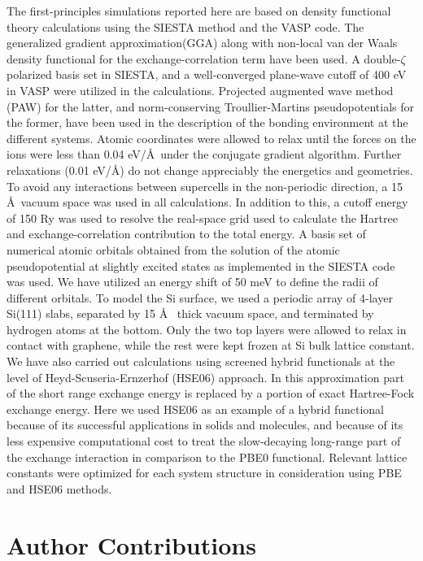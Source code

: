 The first-principles simulations reported here are
based on density functional theory calculations using the {\ttfamily
SIESTA} method\cite{Soler_02_siesta} and the {\ttfamily VASP}
code\cite{Kresse_93_open_shell,Kresse_1996_1}.
%
The generalized gradient approximation(GGA)\cite{Perdew_1996_GGA}
along with non-local van der Waals density functional for the
exchange-correlation term\cite{Dion_2004_vdw} have been used.
%
A double-$\zeta$ polarized basis set in {\ttfamily SIESTA}, and a
well-converged plane-wave cutoff of 400 eV in {\ttfamily VASP} were
utilized in the calculations. Projected augmented wave method
(PAW)\cite{Blochl_1994_PW,Kresse_1999_pseudopotentials} for the latter, and norm-conserving
Troullier-Martins pseudopotentials\cite{troullier91} for the former,
have been used in the description of the bonding environment at the
different systems.  Atomic coordinates were allowed to relax until the
forces on the ions were less than 0.04 eV/\AA~under the conjugate
gradient algorithm.  Further relaxations (0.01 eV/\AA) do not change
appreciably the energetics and geometries.  To avoid any interactions
between supercells in the non-periodic direction, a 15 \AA~vacuum
space was used in all calculations. In addition to this, a cutoff
energy of 150 Ry was used to resolve the real-space grid used to
calculate the Hartree and exchange-correlation contribution to the
total energy.  A basis set of numerical atomic orbitals obtained from
the solution of the atomic pseudopotential at slightly excited states
as implemented in the {\ttfamily SIESTA}\cite{Soler_02_siesta} code was
used. We have utilized an energy shift of 50 meV to define the radii
of different orbitals.  To model the Si surface, we used a periodic
array of 4-layer Si(111) slabs, separated by 15 \AA~ thick vacuum
space, and terminated by hydrogen atoms at the bottom.  Only the two
top layers were allowed to relax in contact with graphene, while the
rest were kept frozen at Si bulk lattice constant.  We have also
carried out calculations using screened hybrid functionals at the
level of Heyd-Scuseria-Ernzerhof (HSE06) approach\cite{Heyd_2003_HSe,HSE_2006_erratum}. In this
approximation part of the short range exchange energy is replaced by a
portion of exact Hartree-Fock exchange energy.  Here we used HSE06 as
an example of a hybrid functional because of its successful
applications in solids and
molecules\cite{Kresse_1996_1,Kresse_1996_2,Franchini07}, and because of its less
expensive computational cost to treat the slow-decaying long-range
part of the exchange interaction in comparison to the PBE0
functional\cite{Heyd_2003_HSe}.  Relevant lattice constants were
optimized for each system structure in consideration using PBE and
HSE06 methods.

\section{Author Contributions}
\label{sec:qc-author-contributions}


